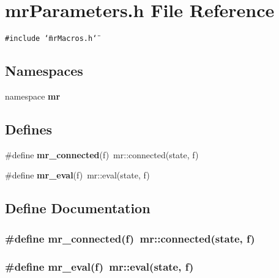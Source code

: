\section{mr\-Parameters.h File Reference}
\label{mrParameters_8h}
{\tt \#include \char`\"{}mr\-Macros.h\char`\"{}}\par
\subsection*{Namespaces}
\begin{CompactItemize}
\item 
namespace {\bf mr}
\end{CompactItemize}
\subsection*{Defines}
\begin{CompactItemize}
\item 
\#define {\bf mr\_\-connected}(f)\ mr::connected(state, f)
\item 
\#define {\bf mr\_\-eval}(f)\ mr::eval(state, f)
\end{CompactItemize}


\subsection{Define Documentation}
\subsubsection{\setlength{\rightskip}{0pt plus 5cm}\#define mr\_\-connected(f)\ mr::connected(state, f)}\label{mrParameters_8h_a0}


\subsubsection{\setlength{\rightskip}{0pt plus 5cm}\#define mr\_\-eval(f)\ mr::eval(state, f)}\label{mrParameters_8h_a1}


